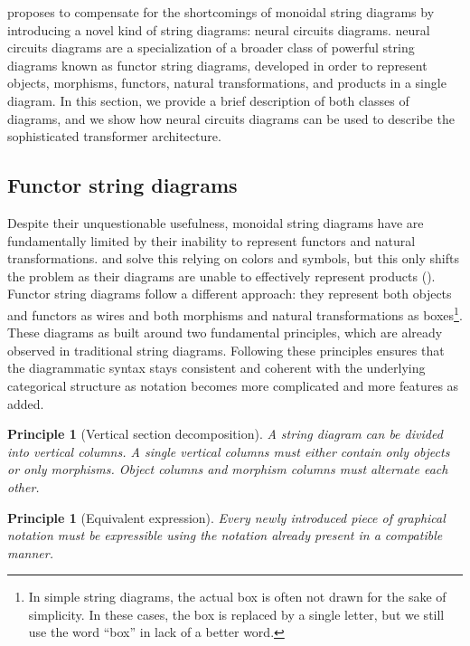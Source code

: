 \documentclass[11pt,a4paper,openright,twoside]{report}
\newcounter{mycounter}
\theoremstyle{plain}
\newtheorem{principle}[mycounter]{Principle}
\theoremstyle{definition}
\newcommand\dblquote[1]{\textquotedblleft #1\textquotedblright}
\begin{document}
\cite{abbott2023robust} proposes to compensate for the shortcomings of monoidal string diagrams by introducing a novel kind of string diagrams: neural circuits diagrams. neural circuits diagrams are a specialization of a broader class of powerful string diagrams known as functor string diagrams, developed in order to represent objects, morphisms, functors, natural transformations, and products in a single diagram. In this section, we provide a brief description of both classes of diagrams, and we show how neural circuits diagrams can be used to describe the sophisticated transformer architecture.


\subsection{Functor string diagrams}

Despite their unquestionable usefulness, monoidal string diagrams have are fundamentally limited by their inability to represent functors and natural transformations. \cite{marsden2014category} and \cite{nakahira2023diagrammatic} solve this relying on colors and symbols, but this only shifts the problem as their diagrams are unable to effectively represent products (\cite{abbott2024functor}). Functor string diagrams follow a different approach: they represent both objects and functors as wires and both morphisms and natural transformations as boxes\footnote{In simple string diagrams, the actual box is often not drawn for the sake of simplicity. In these cases, the box is replaced by a single letter, but we still use the word \dblquote{box} in lack of a better word.}. These diagrams as built around two fundamental principles, which are already observed in traditional string diagrams. Following these principles ensures that the diagrammatic syntax stays consistent and coherent with the underlying categorical structure as notation becomes more complicated and more features as added. 

\begin{principle}[Vertical section decomposition]
  A string diagram can be divided into vertical columns. A single vertical columns must either contain only objects or only morphisms. Object columns and morphism columns must alternate each other.
\end{principle}

\begin{principle}[Equivalent expression]
  Every newly introduced piece of graphical notation must be expressible using the notation already present in a compatible manner.
\end{principle}
\end{document}
